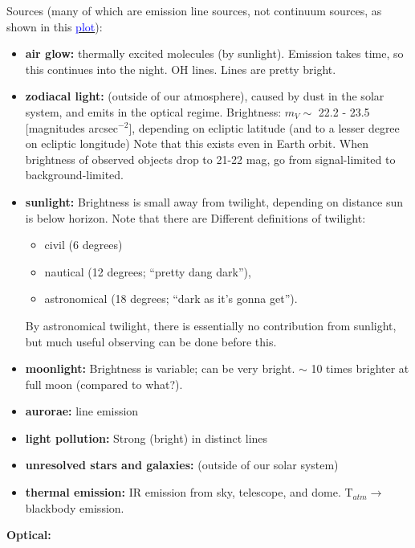 \documentclass[12pt]{article}
\begin{document}
Sources
(many of which are emission line sources, not continuum
sources, as shown in this
\href{http://astronomy.nmsu.edu/holtz/a535/html/diagrams/a535/skyemiss.htm}
{\textcolor{blue}{plot}}):
\begin{itemize}
    \item \textbf{air glow:} thermally excited molecules (by sunlight).
        Emission takes time, so this continues into the night.
        OH lines. Lines are pretty bright.
    \item \textbf{zodiacal light:}
        (outside of our atmosphere), caused by dust in the solar system,
        and emits in the optical regime.
        Brightness: $m_V \sim$ 22.2 - 23.5 [magnitudes arcsec$^{-2}$],
        depending on ecliptic latitude
        (and to a lesser degree on ecliptic longitude)
        Note that this exists even in Earth orbit.
        When brightness of observed objects drop to 21-22 mag,
        go from signal-limited to background-limited.
    \item \textbf{sunlight:} Brightness is
        small away from twilight, depending on distance sun is below horizon. Note that there are
        Different definitions of twilight:
        \begin{itemize}
            \item civil (6 degrees)
            \item nautical (12 degrees; ``pretty dang dark''),
            \item astronomical (18 degrees; ``dark as it's gonna get'').
        \end{itemize}
        By astronomical twilight, there is essentially no contribution
        from sunlight, but much useful observing can be done before this.
    \item \textbf{moonlight:} Brightness is variable; can be very bright.
        $\sim$ 10 times brighter at full moon (compared to what?).
    \item \textbf{aurorae:} line emission
    \item \textbf{light pollution:} Strong (bright) in distinct lines
    \item \textbf{unresolved stars and galaxies:}
        (outside of our solar system)
    \item \textbf{thermal emission:} IR emission from sky,
        telescope, and dome.
        T$_{atm} \rightarrow$ blackbody emission.
\end{itemize}

\textbf{Optical:}
\end{document}
